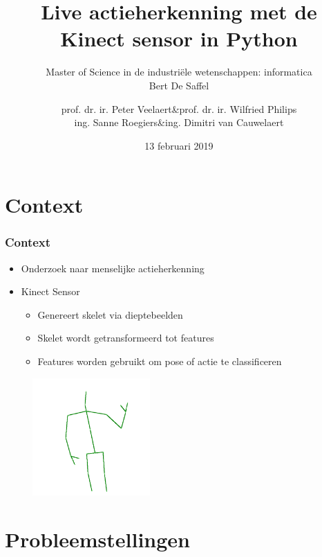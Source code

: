 \documentclass[]{beamer}
\begin{document}
	\title[Actieherkenning met de Kinect sensor]{Live actieherkenning met de Kinect sensor in Python}
	\author[Bert De Saffel]{
				\begin{tabular}{rcr}
				prof. dr. ir. Peter Veelaert &\&& prof. dr. ir. Wilfried Philips \\
				ing. Sanne Roegiers &\&& ing. Dimitri van Cauwelaert
				\end{tabular}
	}
	
	\subtitle{Master of Science in de industriële wetenschappen: informatica \\ \vspace{0.2cm} Bert De Saffel}
	\date{13 februari 2019}
	\frame{\titlepage}
	
	\section{Context}
	
	\begin{frame}
	\frametitle{Context}
		\begin{itemize}
			\item<2- > Onderzoek naar menselijke actieherkenning
			\item<3- > Kinect Sensor 
			\begin{itemize}
				\item<3- > Genereert skelet via dieptebeelden
				\item<3- > Skelet wordt getransformeerd tot features
				\item<3- > Features worden gebruikt om pose of actie te classificeren
			\end{itemize}
		\end{itemize}
		\begin{figure}
			\includegraphics[width=0.4\textwidth]{skeleton}
		\end{figure}
	\end{frame}

	
	\section{Probleemstellingen}
\end{document}

